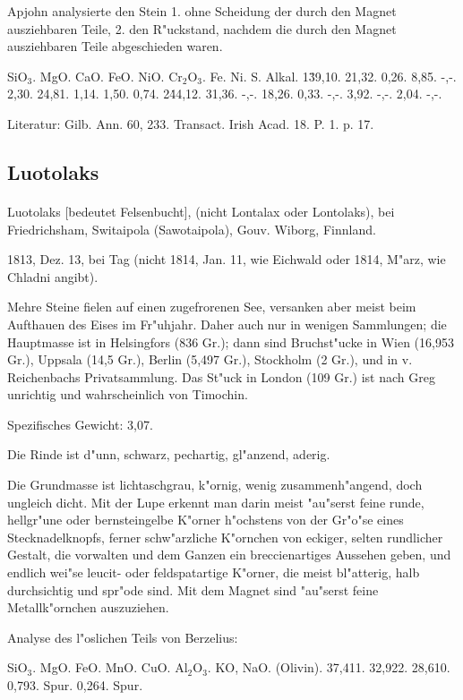\documentclass[a4paper, 11pt, oneside]{article}
\begin{document}
Apjohn analysierte den Stein 1. ohne Scheidung der durch den Magnet ausziehbaren Teile, 2. den R"uckstand, nachdem die durch den Magnet ausziehbaren Teile abgeschieden waren.

SiO$_{3}$. MgO. CaO. FeO. NiO. Cr$_{2}$O$_{3}$. Fe. Ni. S. Alkal.  
1\. 39,10. 21,32. 0,26. 8,85. -,-. 2,30. 24,81. 1,14. 1,50. 0,74.  
2\. 44,12. 31,36. -,-. 18,26. 0,33. -,-. 3,92. -,-. 2,04. -,-.

Literatur: Gilb. Ann. 60, 233. Transact. Irish Acad. 18. P. 1. p. 17.

\subsection{Luotolaks}
\normalsize
\paragraph{}
Luotolaks [bedeutet Felsenbucht], (nicht Lontalax oder Lontolaks), bei Friedrichsham, Switaipola (Sawotaipola), Gouv. Wiborg, Finnland.

1813, Dez. 13, bei Tag (nicht 1814, Jan. 11, wie Eichwald oder 1814, M"arz, wie Chladni angibt).

Mehre Steine fielen auf einen zugefrorenen See, versanken aber meist beim Aufthauen des Eises im Fr"uhjahr. Daher auch nur in wenigen Sammlungen; die Hauptmasse ist in Helsingfors (836 Gr.); dann sind Bruchst"ucke in Wien (16,953 Gr.), Uppsala (14,5 Gr.), Berlin (5,497 Gr.), Stockholm (2 Gr.), und in v. Reichenbachs Privatsammlung. Das St"uck in London (109 Gr.) ist nach Greg unrichtig und wahrscheinlich von Timochin.

Spezifisches Gewicht: 3,07.

Die Rinde ist d"unn, schwarz, pechartig, gl"anzend, aderig.

Die Grundmasse ist lichtaschgrau, k"ornig, wenig zusammenh"angend, doch ungleich dicht. Mit der Lupe erkennt man darin meist "au"serst feine runde, hellgr"une oder bernsteingelbe K"orner h"ochstens von der Gr"o"se eines Stecknadelknopfs, ferner schw"arzliche K"ornchen von eckiger, selten rundlicher Gestalt, die vorwalten und dem Ganzen ein breccienartiges Aussehen geben, und endlich wei"se leucit- oder feldspatartige K"orner, die meist bl"atterig, halb durchsichtig und spr"ode sind. Mit dem Magnet sind "au"serst feine Metallk"ornchen auszuziehen.

Analyse des l"oslichen Teils von Berzelius:

SiO$_{3}$. MgO. FeO. MnO. CuO. Al$_{2}$O$_{3}$. KO, NaO. (Olivin).  
37,411. 32,922. 28,610. 0,793. Spur. 0,264. Spur.
\end{document}
